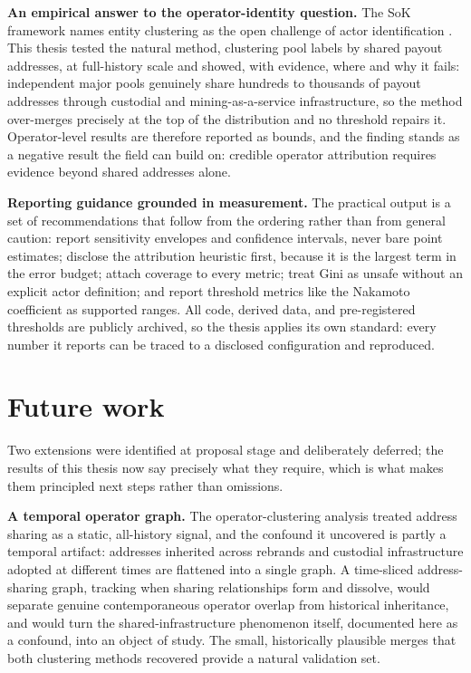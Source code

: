 \documentclass[logo,msc]{infthesis}           %
\begin{document}
\textbf{An empirical answer to the operator-identity question.} The SoK
framework names entity clustering as the open challenge of actor
identification \cite{ovezik2025sok}. This thesis tested the natural method,
clustering pool labels by shared payout addresses, at full-history scale
and showed, with evidence, where and why it fails: independent major pools
genuinely share hundreds to thousands of payout addresses through custodial
and mining-as-a-service infrastructure, so the method over-merges precisely at
the top of the distribution and no threshold repairs it. Operator-level
results are therefore reported as bounds, and the finding stands as a negative
result the field can build on: credible operator attribution requires
evidence beyond shared addresses alone.

\textbf{Reporting guidance grounded in measurement.} The practical output is
a set of recommendations that follow from the ordering rather than from
general caution: report sensitivity envelopes and confidence intervals, never
bare point estimates; disclose the attribution heuristic first, because it is
the largest term in the error budget; attach coverage to every metric; treat
Gini as unsafe without an explicit actor definition; and report threshold
metrics like the Nakamoto coefficient as supported ranges. All code, derived
data, and pre-registered thresholds are publicly archived, so the thesis
applies its own standard: every number it reports can be traced to a
disclosed configuration and reproduced.

\section{Future work}
\label{sec:conc-future}

Two extensions were identified at proposal stage and deliberately deferred;
the results of this thesis now say precisely what they require, which is what
makes them principled next steps rather than omissions.

\textbf{A temporal operator graph.} The operator-clustering analysis treated
address sharing as a static, all-history signal, and the confound it uncovered
is partly a temporal artifact: addresses inherited across rebrands and
custodial infrastructure adopted at different times are flattened into a
single graph. A time-sliced address-sharing graph, tracking when sharing
relationships form and dissolve, would separate genuine contemporaneous
operator overlap from historical inheritance, and would turn the
shared-infrastructure phenomenon itself, documented here as a confound, into
an object of study. The small, historically plausible merges that both
clustering methods recovered provide a natural validation set.
\end{document}
